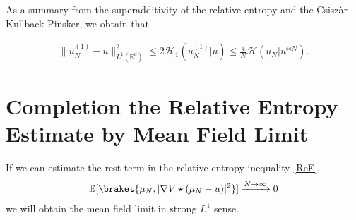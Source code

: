 As a summary from the superadditivity of the relative entropy and the Csisz\`ar-Kullback-Pinsker, we obtain that
\begin{corollary}
\begin{align*}
\|u_N^{(1)}-u \|_{L^1(\mathbb{R}^d)}^{2} \le  2 \mathcal{H}_1(u_{N}^{(1)} | u )\leq \frac{4}{N} \mathcal{H}(u_N | u^{\otimes N} )
.\end{align*}	
\end{corollary}

\section{Completion the Relative Entropy Estimate by Mean Field Limit}

If we can estimate the rest term in the relative entropy inequality \autoref{ReE}, 
\begin{align*}
  \E[\braket{\mu_N , \abs{\nabla V \star (\mu_N - u)}^2}]  \xrightarrow{N\to \infty} 0 
\end{align*}
we will obtain the mean field limit in strong $L^1$ sense.
 
